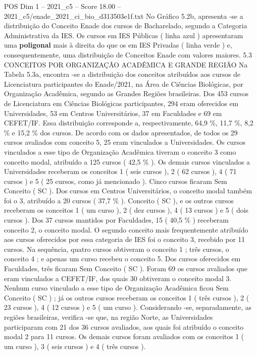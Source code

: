 \begin{textsample}{POS Dim 1 – 2021\_c5 – Score 18.00 – 2021\_c5/enade\_2021\_ci\_bio\_d313503e1f.txt}
No Gráfico 5.2b, apresenta -se a distribuição do Conceito Enade dos cursos de Bacharelado, segundo a Categoria Administrativa da IES.
Os cursos em IES Públicas ( linha azul ) apresentaram uma \textbf{poligonal} mais à direita do que os em IES Privadas ( linha verde ) e, consequentemente, uma distribuição de Conceitos Enade com valores maiores. 5.3 CONCEITOS POR ORGANIZAÇÃO ACADÊMICA E GRANDE REGIÃO Na Tabela 5.3a, encontra -se a distribuição dos conceitos atribuídos aos cursos de Licenciatura participantes do Enade/2021, na Área de Ciências Biológicas, por Organização Acadêmica, segundo as Grandes Regiões brasileiras.
Dos 453 cursos de Licenciatura em Ciências Biológicas participantes, 294 eram oferecidos em Universidades, 53 em Centros Universitários, 37 em Faculdades e 69 em CEFET/IF.
Essa distribuição corresponde a, respectivamente, 64,9 \%, 11,7 \%, 8,2 \% e 15,2 \% dos cursos.
De acordo com os dados apresentados, de todos os 29 cursos avaliados com conceito 5, 25 eram vinculados a Universidades.
Os cursos vinculados a esse tipo de Organização Acadêmica tiveram o conceito 3 como conceito modal, atribuído a 125 cursos ( 42,5 \% ).
Os demais cursos vinculados a Universidades receberam os conceitos 1 ( seis cursos ), 2 ( 62 cursos ), 4 ( 71 cursos ) e 5 ( 25 cursos, como já mencionado ).
Cinco cursos ficaram Sem Conceito ( SC ).
Dos cursos em Centros Universitários, o conceito modal também foi o 3, atribuído a 20 cursos ( 37,7 \% ).
Conceito ( SC ), e os outros cursos receberam os conceitos 1 ( um curso ), 2 ( dez cursos ), 4 ( 13 cursos ) e 5 ( dois cursos ).
Dos 37 cursos mantidos por Faculdades, 15 ( 40,5 \% ) receberam conceito 2, o conceito modal.
O segundo conceito mais frequentemente atribuído aos cursos oferecidos por essa categoria de IES foi o conceito 3, recebido por 11 cursos.
Na sequência, quatro cursos obtiveram o conceito 1 ; três cursos, o conceito 4 ; e apenas um curso recebeu o conceito 5.
Dos cursos oferecidos em Faculdades, três ficaram Sem Conceito ( SC ).
Foram 69 os cursos avaliados que eram vinculados a CEFET/IF, dos quais 30 obtiveram o conceito modal 3.
Nenhum curso vinculado a esse tipo de Organização Acadêmica ficou Sem Conceito ( SC ) ; já os outros cursos receberam os conceitos 1 ( três cursos ), 2 ( 23 cursos ), 4 ( 12 cursos ) e 5 ( um curso ).
Considerando -se, separadamente, as regiões brasileiras, verifica -se que, na região Norte, as Universidades participaram com 21 dos 36 cursos avaliados, aos quais foi atribuído o conceito modal 2 para 11 cursos.
Os demais cursos foram avaliados com os conceitos 1 ( um curso ), 3 ( seis cursos ) e 4 ( três cursos ).

\end{textsample}
